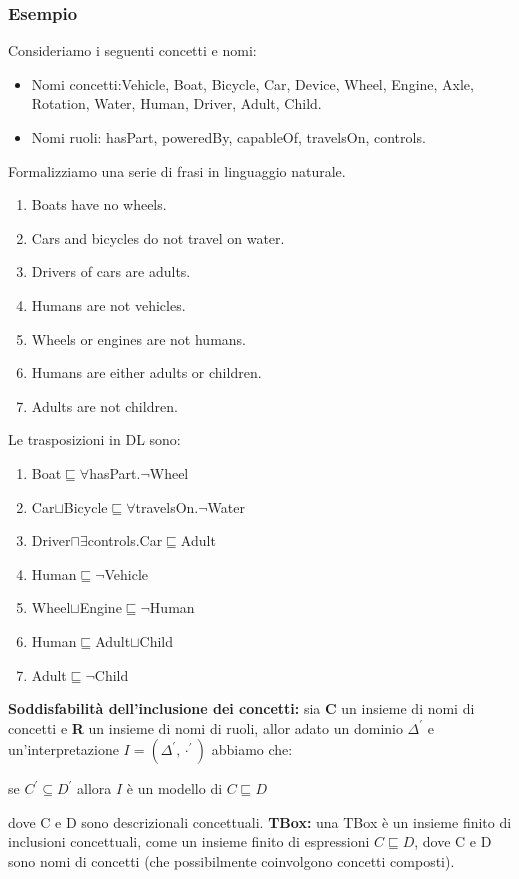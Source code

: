 \documentclass[../main.tex]{subfiles}
\newcommand{\spazio}{\vspace{2em} \newline}
\begin{document}
   \subsubsection{Esempio}
   Consideriamo i seguenti concetti e nomi:
   \begin{itemize}
      \item Nomi concetti:Vehicle, Boat, Bicycle, Car, Device, Wheel, Engine, Axle, Rotation, Water, Human, Driver, Adult, Child.
      \item Nomi ruoli: hasPart, poweredBy, capableOf, travelsOn, controls.
   \end{itemize}
   Formalizziamo una serie di frasi in linguaggio naturale.
   \begin{enumerate}
      \item Boats have no wheels.
      \item Cars and bicycles do not travel on water.
      \item Drivers of cars are adults.
      \item Humans are not vehicles.
      \item Wheels or engines are not humans.
      \item Humans are either adults or children.
      \item Adults are not children.
   \end{enumerate}
   Le trasposizioni in DL sono:
   \begin{enumerate}
      \item Boat$\sqsubseteq \forall$hasPart.$\lnot$Wheel
      \item Car$\sqcup$Bicycle$\sqsubseteq \forall$travelsOn.$\lnot$Water
      \item Driver$\sqcap \exists$controls.Car$\sqsubseteq$Adult
      \item Human$\sqsubseteq \lnot$Vehicle
      \item Wheel$\sqcup$Engine$\sqsubseteq \lnot$Human
      \item Human$\sqsubseteq$Adult$\sqcup$Child
      \item Adult$\sqsubseteq \lnot$Child
   \end{enumerate}
   \vspace{2em}
   \textbf{Soddisfabilità dell'inclusione dei concetti:} sia \textbf{C} un insieme di nomi di concetti e \textbf{R} un insieme di nomi di ruoli, allor adato un dominio $\Delta^\prime$ e un'interpretazione $I = (\Delta^\prime, \cdot^\prime)$ abbiamo che:
   \begin{center}
      se $C^\prime \subseteq D^\prime$ allora $I$ è un modello di $C \sqsubseteq D$
   \end{center}
   dove C e D sono descrizionali concettuali.
   \spazio
   \textbf{TBox:} una TBox è un insieme finito di inclusioni concettuali, come un insieme finito di espressioni $C \sqsubseteq D$, dove C e D sono nomi di concetti (che possibilmente coinvolgono concetti composti).
   
\end{document}
